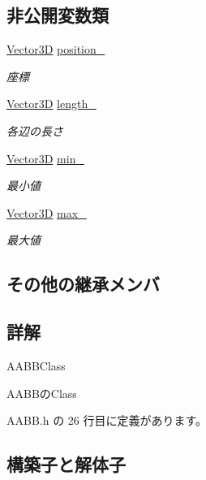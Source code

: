 \subsection*{非公開変数類}
\begin{DoxyCompactItemize}
\item 
\mbox{\hyperlink{class_vector3_d}{Vector3D}} \mbox{\hyperlink{class_a_a_b_b_a3ca25dc046fa31d1baafa8c8a1174302}{position\+\_\+}}
\begin{DoxyCompactList}\small\item\em 座標 \end{DoxyCompactList}\item 
\mbox{\hyperlink{class_vector3_d}{Vector3D}} \mbox{\hyperlink{class_a_a_b_b_abade307dbbfa9c74638fde5387d629f8}{length\+\_\+}}
\begin{DoxyCompactList}\small\item\em 各辺の長さ \end{DoxyCompactList}\item 
\mbox{\hyperlink{class_vector3_d}{Vector3D}} \mbox{\hyperlink{class_a_a_b_b_a682f7bc02fc950a24ce8a8e512e4eb52}{min\+\_\+}}
\begin{DoxyCompactList}\small\item\em 最小値 \end{DoxyCompactList}\item 
\mbox{\hyperlink{class_vector3_d}{Vector3D}} \mbox{\hyperlink{class_a_a_b_b_a7f8dca79cab056729bde7139b219fcbe}{max\+\_\+}}
\begin{DoxyCompactList}\small\item\em 最大値 \end{DoxyCompactList}\end{DoxyCompactItemize}
\subsection*{その他の継承メンバ}


\subsection{詳解}
A\+A\+B\+B\+Class 

A\+A\+B\+Bの\+Class 

 A\+A\+B\+B.\+h の 26 行目に定義があります。



\subsection{構築子と解体子}
\mbox{\label{class_a_a_b_b_a5f5baf6c533905aa1456b3a3eb57bab2}} 
